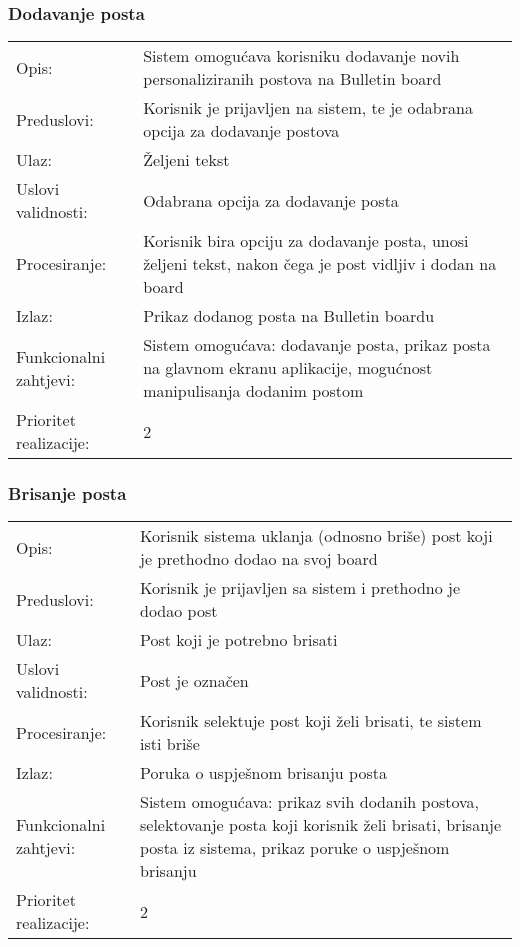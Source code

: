 \subsubsection{Dodavanje posta}

\begin{tabu} to 1.2
Opis: & Sistem omogućava korisniku dodavanje novih personaliziranih postova na Bulletin board \\
Preduslovi: & Korisnik je prijavljen na sistem, te je odabrana opcija za dodavanje postova \\
Ulaz: & Željeni tekst \\
Uslovi validnosti: &  Odabrana opcija za dodavanje posta \\
Procesiranje: & Korisnik bira opciju za dodavanje posta, unosi željeni tekst, nakon čega je post vidljiv i dodan na board \\
Izlaz: & Prikaz dodanog posta na Bulletin boardu \\
Funkcionalni zahtjevi: & Sistem omogućava: dodavanje posta, prikaz posta na glavnom ekranu aplikacije, mogućnost manipulisanja dodanim postom \\
Prioritet realizacije: & 2

\end{tabu}
\newpage
\subsubsection{Brisanje posta}

\begin{tabu} to 1.2
Opis: & Korisnik sistema uklanja (odnosno briše) post koji je prethodno dodao na svoj board\\
Preduslovi: & Korisnik je prijavljen sa sistem i prethodno je dodao post \\
Ulaz: & Post koji je potrebno brisati \\
Uslovi validnosti: & Post je označen \\
Procesiranje: & Korisnik selektuje post koji želi brisati, te sistem isti briše \\
Izlaz: & Poruka o uspješnom brisanju posta \\
Funkcionalni zahtjevi: & Sistem omogućava: prikaz svih dodanih postova, selektovanje posta koji korisnik želi brisati, brisanje posta iz sistema, prikaz poruke o uspješnom brisanju \\
Prioritet realizacije: & 2

\end{tabu}
\newpage
